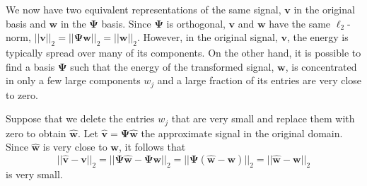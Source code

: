 We now have two equivalent representations of the same signal, $\bm v$ in the original basis and $\bm w$ in the $\bm\Psi$ basis.
Since $\bm\Psi$ is orthogonal, $\bm v$ and $\bm w$ have the same $\ell_2$-norm, $||\bm v||_2 = ||\bm\Psi\bm w||_2 = ||\bm w||_2$.
However, in the original signal, $\bm v$, the energy is typically spread over many of its components.
On the other hand, it is possible to find a basis $\bm\Psi$ such that the energy of the transformed signal, $\bm w$, is concentrated in only a few large components $w_j$ and a large fraction of its entries are very close to zero.

Suppose that we delete the entries $w_j$ that are very small and replace them with zero to obtain $\bm{\hat w}$.
Let $\bm{\hat v} = \bm\Psi\hat{\bm w}$ the approximate signal in the original domain.
Since $\bm{\hat w}$ is very close to $\bm w$, it follows that
\begin{equation*}
  ||\bm{\hat v} - \bm v||_2 = ||\bm\Psi\bm{\hat w} - \bm\Psi\bm w||_2 = ||\bm\Psi (\bm{\hat w} - \bm w)||_2 = ||\bm{\hat w} - \bm w||_2
\end{equation*}
is very small.

